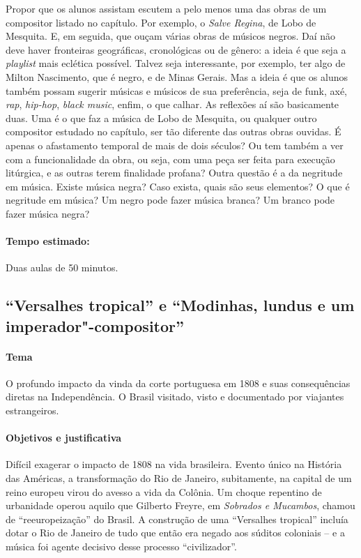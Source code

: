 \documentclass[11pt]{extarticle}
\begin{document}
Propor que os alunos assistam escutem a pelo menos uma das obras de um
compositor listado no capítulo. Por exemplo, o \emph{Salve Regina}, de Lobo de
Mesquita. E, em seguida, que ouçam várias obras de músicos negros. Daí não deve
haver fronteiras geográficas, cronológicas ou de gênero: a ideia é que seja a
\textit{playlist} mais eclética possível. Talvez seja interessante, por exemplo, ter
algo de Milton Nascimento, que é negro, e de Minas Gerais. Mas a ideia é que os
alunos também possam sugerir músicas e músicos de sua preferência, seja de
funk, axé, \textit{rap}, \textit{hip-hop}, \textit{black music}, enfim, o que calhar. As reflexões aí são
basicamente duas. Uma é o que faz a música de Lobo de Mesquita, ou qualquer
outro compositor estudado no capítulo, ser tão diferente das outras obras
ouvidas. É apenas o afastamento temporal de mais de dois séculos? Ou tem também
a ver com a funcionalidade da obra, ou seja, com uma peça ser feita para
execução litúrgica, e as outras terem finalidade profana? Outra questão é a da
negritude em música. Existe música negra? Caso exista, quais são seus
elementos? O que é negritude em música? Um negro pode fazer música branca? Um
branco pode fazer música negra?

\paragraph{Tempo estimado:} Duas aulas de 50 minutos. 


\subsection{``Versalhes tropical'' e ``Modinhas, lundus e um
imperador"-compositor''}

\paragraph{Tema} O profundo impacto da vinda da corte portuguesa em 1808 e suas
consequências diretas na Independência. O Brasil visitado, visto e documentado
por viajantes estrangeiros. 

\paragraph{Objetivos e justificativa}

Difícil exagerar o impacto de 1808 na vida brasileira. Evento único na História
das Américas, a transformação do Rio de Janeiro, subitamente, na capital de um
reino europeu virou do avesso a vida da Colônia. Um choque repentino de
urbanidade operou aquilo que Gilberto Freyre, em \emph{Sobrados e Mucambos}, chamou de
“reeuropeização” do Brasil. A construção de uma “Versalhes tropical” incluía
dotar o Rio de Janeiro de tudo que então era negado aos súditos coloniais –  e
a música foi agente decisivo desse processo “civilizador”.
\end{document}
